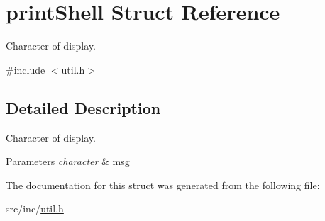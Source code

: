 \hypertarget{structprint_shell}{}\section{print\+Shell Struct Reference}
\label{structprint_shell}


Character of display.  




{\ttfamily \#include $<$util.\+h$>$}



\subsection{Detailed Description}
Character of display. 


\begin{DoxyParams}{Parameters}
{\em character} & msg \\
\hline
\end{DoxyParams}


The documentation for this struct was generated from the following file\+:\begin{DoxyCompactItemize}
\item 
src/inc/\mbox{\hyperlink{util_8h}{util.\+h}}\end{DoxyCompactItemize}
